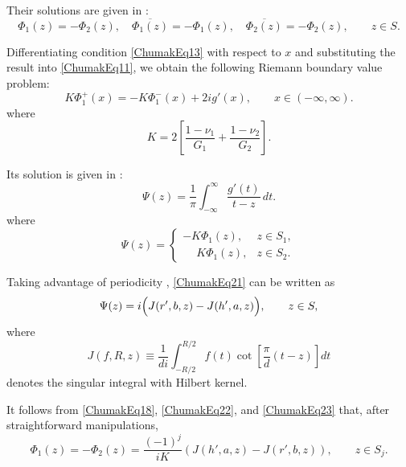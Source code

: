 Their solutions are given in \cite{Chumak34}:
\begin{equation}
	\label{ChumakEq18}
	\Phi_{1}(z) = -\Phi_{2}(z),
	\quad
	\overline{\Phi_{1}(z)} = -\Phi_{1}(z),
	\quad
	\overline{\Phi_{2}(z)} = -\Phi_{2}(z),
	\qquad z \in S.
\end{equation}

Differentiating condition \eqref{ChumakEq13} with respect to $x$ and substituting the result into \eqref{ChumakEq11}, we obtain the following Riemann boundary value problem:
\begin{equation}
	\label{ChumakEq19}
	K \Phi_{1}^{+}(x)
	= -K \Phi_{1}^{-}(x) + 2i g'(x),
	\qquad x \in (-\infty,\infty).
\end{equation}
%
where
\begin{equation}
	\label{ChumakEq20}
	K = 2\left[
	\frac{1-\nu_{1}}{G_{1}}
	+
	\frac{1-\nu_{2}}{G_{2}}
	\right].
\end{equation}

Its solution is given in \cite{Chumak34}:
\begin{equation}
	\label{ChumakEq21}
	\Psi(z)
	=
	\frac{1}{\pi}
	\int_{-\infty}^{\infty}
	\frac{g'(t)}{t - z}\, dt.
\end{equation}
%
where
\begin{equation}
	\label{ChumakEq22}
	\Psi(z)
	=
	\begin{cases}
		- K \Phi_{1}(z), & z \in S_{1}, \\
		\phantom{-} K \Phi_{1}(z), & z \in S_{2}.
	\end{cases}
\end{equation}

Taking advantage of periodicity \cite{Chumak4}, \eqref{ChumakEq21} can be written as
\begin{equation}
	\label{ChumakEq23}
	\Psi(z)
	=
	i\Bigl(
	J(r',b,z) - J(h',a,z)
	\Bigr),
	\qquad z \in S,
\end{equation}
%
where
\begin{equation}
	\label{ChumakEq24}
	J(f,R,z)
	\equiv
	\frac{1}{d i}
	\int_{-R/2}^{R/2}
	f(t)
	\cot\!\left[
	\frac{\pi}{d}(t - z)
	\right] dt
\end{equation}
%
denotes the singular integral with Hilbert kernel.

It follows from \eqref{ChumakEq18}, \eqref{ChumakEq22}, and \eqref{ChumakEq23} that, after straightforward manipulations,
\begin{equation}
	\label{ChumakEq25}
	\Phi_{1}(z) = -\Phi_{2}(z)
	= \frac{(-1)^{j}}{iK}
	\left(
	J(h',a,z) - J(r',b,z)
	\right),
	\qquad z \in S_{j}.
\end{equation}

